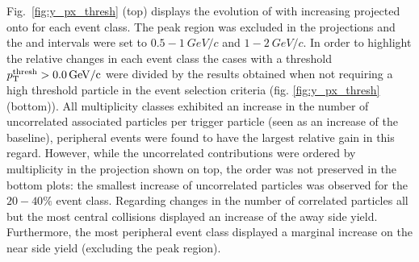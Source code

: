 Fig.~\ref{fig:y_px_thresh} (top) displays the evolution of \Y with increasing \ptthresh projected onto \dphi for each event class. The peak region was excluded in the projections and the \ptassoc and \pttrig intervals were set to $0.5 - \SI{1}{GeV/c}$ and $1-\SI{2}{GeV/c}$. In order to highlight the relative changes in each event class the cases with a threshold $p_{\text{T}}^{\text{thresh}} > \SI{0.0}{GeV/c}$ were divided by the results obtained when not requiring a high \pt threshold particle in the event selection criteria (fig. \ref{fig:y_px_thresh} (bottom)). All multiplicity classes exhibited an increase in the number of uncorrelated associated particles per trigger particle (seen as an increase of the baseline), peripheral events were found to have the largest relative gain  in this regard. However, while the uncorrelated contributions were ordered by multiplicity in the projection shown on top, the order was not preserved in the bottom plots: the smallest increase of uncorrelated particles was observed for the $20-40\%$ event class. Regarding changes in the number of correlated particles all but the most central collisions displayed an increase of the away side yield. Furthermore, the most peripheral event class displayed a marginal increase on the near side yield (excluding the peak region).
